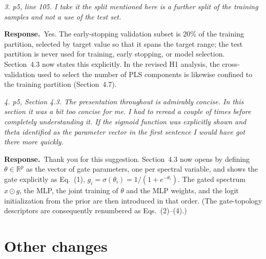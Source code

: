 \documentclass[11pt]{article}
\newenvironment{reviewer}{\par\color{black!70}\itshape}{\par}
\newcommand{\response}{\par\noindent\textbf{Response.}\ }
\begin{document}
\begin{reviewer}
3. p5, line 105. I take it the split mentioned here is a further split of the training samples and not a use of the test set.
\end{reviewer}
\response Yes. The early-stopping validation subset is 20\% of the training partition, selected by target value so that it spans the target range; the test partition is never used for training, early stopping, or model selection. Section~4.3 now states this explicitly. In the revised H1 analysis, the cross-validation used to select the number of PLS components is likewise confined to the training partition (Section~4.7).

\begin{reviewer}
4. p5, Section 4.3. The presentation throughout is admirably concise. In this section it was a bit too concise for me. I had to reread a couple of times before completely understanding it. If the sigmoid function was explicitly shown and theta identified as the parameter vector in the first sentence I would have got there more quickly.
\end{reviewer}
\response Thank you for this suggestion. Section~4.3 now opens by defining $\theta\in\mathbb{R}^{p}$ as the vector of gate parameters, one per spectral variable, and shows the gate explicitly as Eq.~(1), $g_i=\sigma(\theta_i)=1/(1+e^{-\theta_i})$. The gated spectrum $x\odot g$, the MLP, the joint training of $\theta$ and the MLP weights, and the logit initialization from the prior are then introduced in that order. (The gate-topology descriptors are consequently renumbered as Eqs.~(2)--(4).)

\section*{Other changes}
\end{document}
